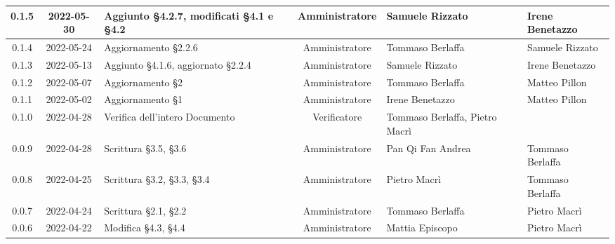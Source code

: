 \begin{center}
\begin{longtable}{ |c|c|p{8em}|c|m{5em}|m{6em}| }
	\hline
	0.1.5 & 2022-05-30 & Aggiunto §4.2.7, modificati §4.1 e §4.2 & Amministratore & Samuele \newline Rizzato & Irene \newline Benetazzo\\
    \hline
	0.1.4 & 2022-05-24 & Aggiornamento §2.2.6 & Amministratore & Tommaso \newline Berlaffa & Samuele \newline Rizzato\\
    \hline
    0.1.3 & 2022-05-13 & Aggiunto §4.1.6, aggiornato §2.2.4 & Amministratore & Samuele \newline Rizzato & Irene \newline Benetazzo\\
    \hline
	0.1.2 & 2022-05-07 & Aggiornamento §2 & Amministratore & Tommaso \newline Berlaffa & Matteo \newline Pillon\\
    \hline
	0.1.1 & 2022-05-02 & Aggiornamento §1 & Amministratore & Irene \newline Benetazzo & Matteo \newline Pillon\\
	\hline
	0.1.0 & 2022-04-28 & Verifica dell'intero Documento & Verificatore & Tommaso Berlaffa, \newline Pietro Macrì & \\
	\hline
	0.0.9 & 2022-04-28 & Scrittura \newline §3.5, §3.6 & Amministratore & Pan Qi Fan \newline Andrea & Tommaso \newline Berlaffa\\
	\hline
	0.0.8 & 2022-04-25 & Scrittura \newline §3.2, §3.3, §3.4 & Amministratore& Pietro \newline Macrì & Tommaso \newline Berlaffa\\
	\hline
	0.0.7 & 2022-04-24 & Scrittura \newline §2.1, §2.2 & Amministratore & Tommaso \newline Berlaffa & Pietro \newline Macrì\\
	\hline
	0.0.6 & 2022-04-22 & Modifica \newline §4.3, §4.4 & Amministratore & Mattia \newline Episcopo & Pietro \newline Macrì\\

\end{longtable}
\end{center}
